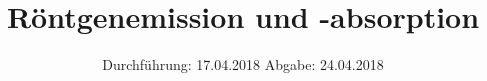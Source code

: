 

\subject{602}
\title{Röntgenemission und -absorption}
\date{%
  Durchführung: 17.04.2018
  \hspace{3em}
  Abgabe: 24.04.2018
}



\maketitle
\thispagestyle{empty}
\tableofcontents
\newpage
\setlength{\parindent}{0em}









\printbibliography{}


